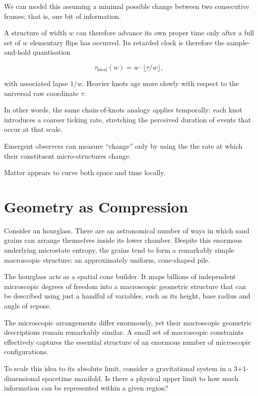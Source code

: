 We can model this assuming a minimal possible change between two consecutive frames; that is, one bit of information.

A structure of width \(w\) can therefore advance its own proper time only after 
a full set of \(w\) elementary flips has occurred. Its retarded clock 
is therefore the sample-and-hold quantisation

\begin{equation}
  \tau_{\mathrm{local}}(w)=w\cdot\bigl\lfloor\tau/w\bigr\rfloor,
\end{equation}

with associated lapse \(1/w\). Heavier knots age more slowly with 
respect to the universal raw coordinate \(\tau\). 

In other words, the same chain-of-knots analogy applies temporally: each knot 
introduces a coarser ticking rate, stretching the perceived duration 
of events that occur at that scale.

Emergent observers can measure ``change'' only by using the the rate at which their constituent micro-structures change.

Matter appears to curve both space and time locally. 



\section*{Geometry as Compression}

Consider an hourglass. There are an astronomical number of ways in which sand grains can arrange themselves inside its lower chamber.
Despite this enormous underlying microstate entropy, the grains tend to form a remarkably simple macroscopic structure: an approximately uniform, cone-shaped pile.

The hourglass acts as a spatial cone builder.
It maps billions of independent microscopic degrees of freedom into a macroscopic geometric structure that can be described using just a handful of variables, such as its height, base radius and angle of repose.

The microscopic arrangements differ enormously, yet their macroscopic geometric descriptions remain remarkably similar.
A small set of macroscopic constraints effectively captures the essential structure of an enormous number of microscopic configurations.

To scale this idea to its absolute limit, consider a gravitational system in a 3+1-dimensional spacetime manifold. Is there a physical upper limit to how much information can be represented within a given region?

